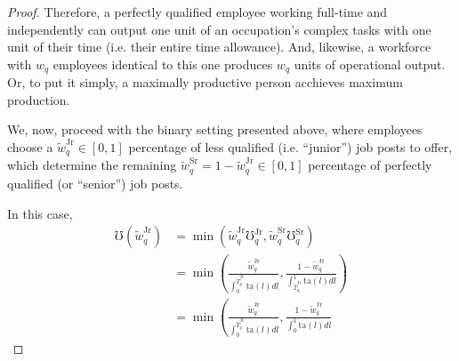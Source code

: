 \documentclass[hidelinks, nonatbib]{elsarticle}
\begin{document}
\begin{lemma}
\begin{proof}
        Therefore, a perfectly qualified employee working full-time and independently can output one unit of an occupation's complex tasks with one unit of their time (i.e. their entire time allowance). And, likewise, a workforce with $w_q$ employees identical to this one produces $w_q$ units of operational output. Or, to put it simply, a maximally productive person acchieves maximum production.
        
        We, now, proceed with the binary setting presented above, where employees choose a $\tilde{w}_{q}^{\text{Jr}} \in [0,1]$ percentage of less qualified (i.e. ``junior'') job posts to offer, which determine the remaining $\tilde{w}_{q}^{\text{Sr}} = 1 - \tilde{w}_{q}^{\text{Jr}} \in [0,1]$ percentage of perfectly qualified (or ``senior'') job posts.
        
        In this case,
        \begin{align}
            \mho(\tilde{w}_{q}^{\text{Jr}})
            &=
            \min\left(
                \tilde{w}_{q}^{\text{Jr}}
                \mho_{q}^{\text{Jr}}
                ,
                \tilde{w}_{q}^{\text{Sr}}
                \mho_{q}^{\text{Sr}}
            \right)
            \\
            &=
            \min\left(
                \frac{
                    \tilde{w}_{q}^{\text{Jr}}
                }{
                    \int_{0}^{
                        \tilde{T}_{q}^{\text{Jr}}
                    }{
                        \text{ta}(l)
                        dl
                    }
                }
                ,
                \frac{
                    1 - \tilde{w}_{q}^{\text{Jr}}
                }{
                    \int_{
                        \tilde{T}_{q}^{\text{Jr}}
                    }^{1}{
                        \text{ta}(l)
                        dl
                    }
                }
            \right)
            \\
            &=
            \min\left(
                \frac{
                    \tilde{w}_{q}^{\text{Jr}}
                }{
                    \int_{0}^{
                        \tilde{T}_{q}^{\text{Jr}}
                    }{
                        \text{ta}(l)
                        dl
                    }
                }
                ,
                \frac{
                    1 - \tilde{w}_{q}^{\text{Jr}}
                }{
                    \int_{0}^{1}{
                        \text{ta}(l)
                        dl
                    }
}
\end{align}
\end{proof}
\end{lemma}
\end{document}
